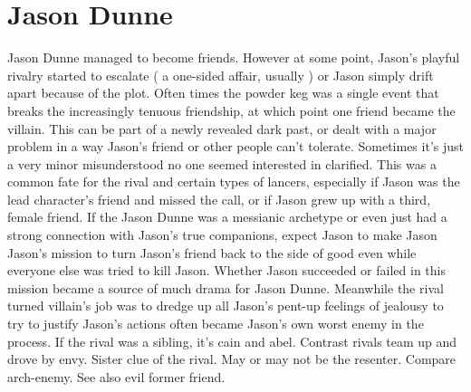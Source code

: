 \documentclass[12pt]{book}
\begin{document}
\chapter{Jason Dunne}

Jason Dunne managed to become friends. However at some point, Jason's playful rivalry started to escalate ( a one-sided affair, usually ) or Jason simply drift apart because of the plot. Often times the powder keg was a single event that breaks the increasingly tenuous friendship, at which point one friend became the villain. This can be part of a newly revealed dark past, or dealt with a major problem in a way Jason's friend or other people can't tolerate. Sometimes it's just a very minor misunderstood no one seemed interested in clarified. This was a common fate for the rival and certain types of lancers, especially if Jason was the lead character's friend and missed the call, or if Jason grew up with a third, female friend. If the Jason Dunne was a messianic archetype or even just had a strong connection with Jason's true companions, expect Jason to make Jason Jason's mission to turn Jason's friend back to the side of good even while everyone else was tried to kill Jason. Whether Jason succeeded or failed in this mission became a source of much drama for Jason Dunne. Meanwhile the rival turned villain's job was to dredge up all Jason's pent-up feelings of jealousy to try to justify Jason's actions often became Jason's own worst enemy in the process. If the rival was a sibling, it's cain and abel. Contrast rivals team up and drove by envy. Sister clue of the rival. May or may not be the resenter. Compare arch-enemy. See also evil former friend.
\end{document}
